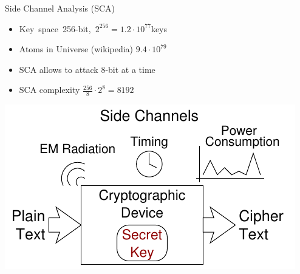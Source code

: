 \documentclass[xcolor=pdftex,dvipsnames,table,final]{beamer}
\begin{document}
\begin{frame}[fragile]{}
\begin{columns}[t]
\begin{column}{.31\linewidth}
\begin{block}{Side Channel Analysis (SCA)}
        \vspace{-2ex}
        \begin{minipage}[t]{0.62\linewidth}
          \begin{itemize}
            \item Key~space~256-bit,~$2^{256} = 1.2 \cdot 10^{77}$keys
            \item Atoms in Universe {\tiny(wikipedia)} $9.4 \cdot 10^{79}$
            \item SCA allows to attack 8-bit at a time
            \item SCA complexity $\frac{256}{8} \cdot 2^{8} = 8192$
          \end{itemize}
        \end{minipage}%
        \begin{minipage}[t]{0.38\linewidth}  
          \vspace{-1ex}%
          \hspace{-1ex}\includegraphics[width=\linewidth]{../figures/sidechannel2}
        \end{minipage}
        

\end{block}
\end{column}
\end{columns}
\end{frame}
\end{document}
